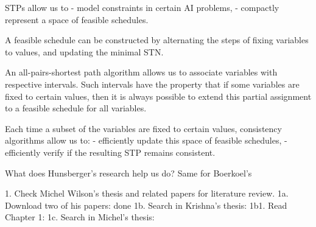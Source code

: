 %
%
%
%

STPs allow us to
- model constraints in certain AI problems,
- compactly represent a space of feasible schedules.

A feasible schedule can be constructed by alternating 
the steps of fixing variables to values, and updating the minimal STN.

An all-pairs-shortest path algorithm allows us to associate variables with respective intervals.
Such intervals have the property that if some variables are fixed to certain values,
then it is always possible to extend this partial assignment to a feasible schedule for all variables.


Each time a subset of the variables are fixed to certain values,
consistency algorithms allow us to:
- efficiently update this space of feasible schedules,
- efficiently verify if the resulting STP remains consistent.

What does Hunsberger's research help us do?
Same for Boerkoel's

1. Check Michel Wilson's thesis and related papers for literature review.
1a. Download two of his papers: done
1b. Search in Krishna's thesis:
1b1. Read Chapter 1:
1c. Search in Michel's thesis:

